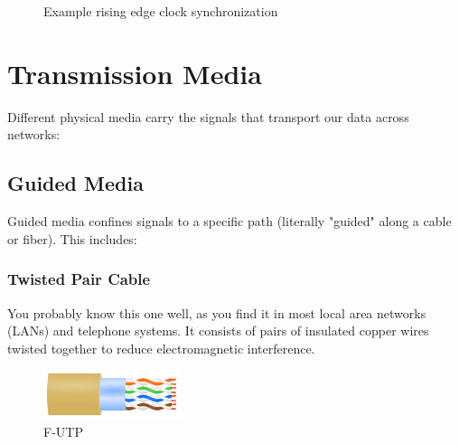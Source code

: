\begin{figure}[h]
    \centering
    \caption{Example rising edge clock synchronization}\label{fig:clock_sync}
\end{figure}
\vfill
\newpage
\section{Transmission Media}
Different physical media carry the signals that transport our data across networks:

\subsection*{Guided Media}
Guided media confines signals to a specific path (literally "guided" along a cable or fiber). This includes:

\subsubsection*{Twisted Pair Cable}
You probably know this one well, as you find it in most local area networks (LANs) and telephone systems. It consists of pairs of insulated copper wires twisted together to reduce electromagnetic interference.

\begin{figure}[h]
    \centering
    \includegraphics[width=4cm]{assets/osi/physical/f-utp.png}
    \caption{F-UTP}\label{fig:twisted_pair}
\end{figure}

